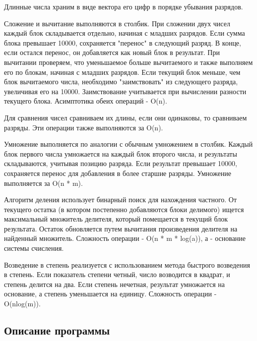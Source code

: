 \documentclass[12pt]{article}
\begin{document}
Длинные числа храним в виде вектора его цифр в порядке убывания разрядов.

Сложение и вычитание выполняются в столбик. При сложении двух чисел каждый блок складывается отдельно, начиная с младших разрядов. Если сумма блока превышает 10000, сохраняется "перенос" в следующий разряд. В конце, если остался перенос, он добавляется как новый блок в результат. При вычитании проверяем, что уменьшаемое больше вычитаемого и также выполняем его по блокам, начиная с младших разрядов. Если текущий блок меньше, чем блок вычитаемого числа, необходимо "заимствовать" из следующего разряда, увеличивая его на 10000. Заимствование учитывается при вычислении разности текущего блока. Асимптотика обеих операций - O(n).

Для сравнения чисел сравниваем их длины, если они одинаковы, то сравниваем разряды. Эти операции также выполняются за O(n).

Умножение выполняется по аналогии с обычным умножением в столбик. Каждый блок первого числа умножается на каждый блок второго числа, и результаты складываются, учитывая позицию разряда. Если результат превышает 10000, сохраняется перенос для добавления в более старшие разряды. Умножение выполняется за O(n * m).

Алгоритм деления использует бинарный поиск для нахождения частного. От текущего остатка (в котором постепенно добавляются блоки делимого) ищется максимальный множитель делителя, который помещается в текущий блок результата. Остаток обновляется путем вычитания произведения делителя на найденный множитель. Сложность операции - O(n * m * log(a)), а - основание системы счисления.

Возведение в степень реализуется с использованием метода быстрого возведения в степень. Если показатель степени четный, число возводится в квадрат, и степень делится на два. Если степень нечетная, результат умножается на основание, а степень уменьшается на единицу. Сложность операции - O(nlog(m)).

\subsection*{Описание программы}
\end{document}
